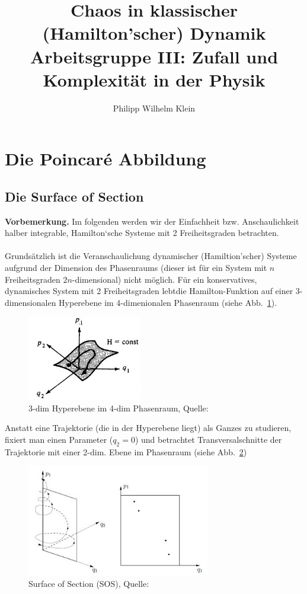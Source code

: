 \documentclass[11pt,a4paper]{article}
\author{Philipp Wilhelm Klein}
\date{}
\title{Chaos in klassischer (Hamilton'scher) Dynamik\bigskip\\ \large Arbeitsgruppe III: \hspace{0.3cm}Zufall und Komplexität in der Physik}
\begin{document}
\maketitle 
\renewcommand{\contentsname}{Inhalt}
\tableofcontents
\thispagestyle{empty}



\section{Die Poincar\'{e} Abbildung}
\subsection{Die \grqq Surface of Section\grqq}


\textbf{Vorbemerkung.} Im folgenden werden wir der Einfachheit bzw. Anschaulichkeit halber integrable, Hamilton`sche Systeme mit 2 Freiheitsgraden betrachten.
\\
\\
Grundsätzlich ist die Veranschaulichung dynamischer (Hamiltion'scher) Systeme aufgrund der Dimension des Phasenraums (dieser ist für ein System mit $ n $ Freiheitsgraden $ 2n $-dimensional) nicht möglich. Für ein konservatives, dynamisches System mit 2 Freiheitsgraden \grqq lebt\grqq die Hamilton-Funktion auf einer 3-dimensionalen Hyperebene im 4-dimenionalen Phasenraum (siehe Abb.~\ref{3dim-Hyperebene}).
\begin{figure}[h]
\centering
\includegraphics[width=5cm]{3dim-Hyperebene-4dim-PR}
\caption{3-dim Hyperebene im 4-dim Phasenraum, Quelle: \cite{LL}}
\label{3dim-Hyperebene}
\end{figure}
Anstatt eine Trajektorie (die in der Hyperebene liegt) als Ganzes zu studieren, fixiert man einen Parameter ($ q_2=0 $) und betrachtet Transversalschnitte der Trajektorie mit einer 2-dim. Ebene im Phasenraum (siehe Abb.~\ref{SOS})
\begin{figure}[h]
\centering
\includegraphics[width=8cm]{SOS}
\caption{Surface of Section (SOS), Quelle: \cite{Wim}}
\label{SOS}
\end{figure}
\end{document}

